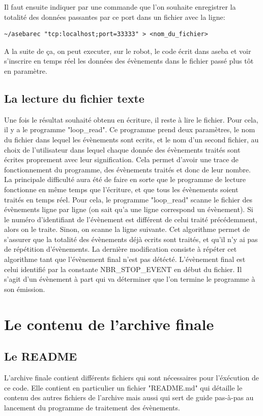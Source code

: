 \documentclass[a4paper, 12pt]{report}
\begin{document}
Il faut ensuite indiquer par une commande que l'on souhaite enregistrer la totalité des données passantes par ce port dans un fichier avec la ligne:
\begin{verbatim}
~/asebarec "tcp:localhost;port=33333" > <nom_du_fichier>
\end{verbatim}
 

A la suite de ça, on peut executer, sur le robot, le code écrit dans aseba et voir s'inscrire en temps réel les données des évènements dans le fichier passé plus tôt en paramètre.

\section{La lecture du fichier texte}
Une fois le résultat souhaité obtenu en écriture, il reste à lire le fichier. Pour cela, il y a le programme "loop\_read". Ce programme prend deux paramètres, le nom du fichier dans lequel les évènements sont ecrits, et le nom d'un second fichier, au choix de l'utilisateur dans lequel chaque donnée des évènements traités sont écrites proprement avec leur signification. Cela permet d'avoir une trace de fonctionnement du programme, des évènements traités et donc de leur nombre.\\
La principale difficulté aura été de faire en sorte que le programme de lecture fonctionne en même temps que l'écriture, et que tous les évènements soient traités en temps réel. Pour cela, le programme "loop\_read" scanne le fichier des évènements ligne par ligne (on sait qu'a une ligne correspond un évènement). Si le numéro d'identifiant de l'évènement est différent de celui traité précédemment, alors on le traite. Sinon, on scanne la ligne suivante. Cet algorithme permet de s'assurer que la totalité des évènements déjà ecrits sont traités, et qu'il n'y ai pas de répétition d'évènements. La dernière modification consiste à répéter cet algorithme tant que l'évènement final n'est pas détécté. L'évènement final est celui identifié par la constante NBR\_STOP\_EVENT en début du fichier. Il s'agit d'un évènement à part qui va déterminer que l'on termine le programme à son émission.


\chapter{Le contenu de l'archive finale}
\section{Le README}
L'archive finale contient différents fichiers qui sont nécessaires pour l'éxécution de ce code. Elle contient en particulier un fichier "README.md" qui détaille le contenu des autres fichiers de l'archive mais aussi qui sert de guide pas-à-pas au lancement du programme de traitement des évènements.
\end{document}

